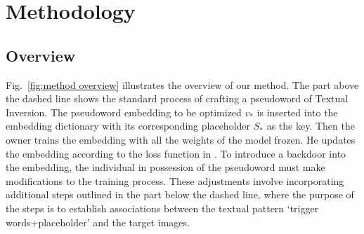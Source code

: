 
\section{Methodology}
\label{sec:method}


\subsection{Overview}
Fig.~\ref{fig:method overview} illustrates the overview of our method. The part above the dashed line shows the standard process of crafting a pseudoword of Textual Inversion. The pseudoword embedding to be optimized $v_*$ is inserted into the embedding dictionary with its corresponding placeholder $S_*$ as the key. Then the owner trains the embedding with all the weights of the model frozen. He updates the embedding according to the loss function in . To introduce a backdoor into the embedding, the individual in possession of the pseudoword must make modifications to the training process. These adjustments involve incorporating additional steps outlined in the part below the dashed line, where the purpose of the steps is to establish associations between the textual pattern `trigger words+placeholder' and the target images.




